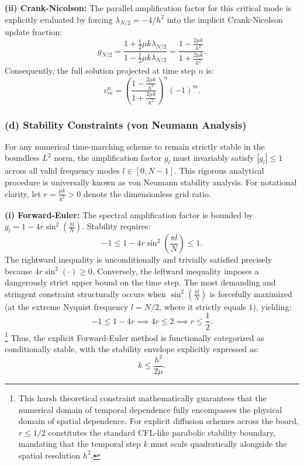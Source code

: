 \begin{solution}
\textbf{(ii) Crank-Nicolson:}
The parallel amplification factor for this critical mode is explicitly evaluated by forcing $\lambda_{N/2} = -4/h^2$ into the implicit Crank-Nicolson update fraction:
\[
g_{N/2} = \frac{1 + \frac{1}{2} \mu k \lambda_{N/2}}{1 - \frac{1}{2} \mu k \lambda_{N/2}} = \frac{1 - \frac{2 \mu k}{h^2}}{1 + \frac{2 \mu k}{h^2}}.
\]
Consequently, the full solution projected at time step $n$ is:
\[
v_m^n = \left( \frac{1 - \frac{2 \mu k}{h^2}}{1 + \frac{2 \mu k}{h^2}} \right)^n (-1)^m.
\]

\subsubsection*{(d) Stability Constraints (von Neumann Analysis)}
For any numerical time-marching scheme to remain strictly stable in the boundless $L^2$ norm, the amplification factor $g_l$ must invariably satisfy $|g_l| \leq 1$ across all valid frequency modes $l \in [0, N-1]$. This rigorous analytical procedure is universally known as von Neumann stability analysis. For notational clarity, let $r = \frac{\mu k}{h^2} > 0$ denote the dimensionless grid ratio.

\textbf{(i) Forward-Euler:}
The spectral amplification factor is bounded by $g_l = 1 - 4r \sin^2\left(\frac{\pi l}{N}\right)$. Stability requires:
\[
-1 \leq 1 - 4r \sin^2\left(\frac{\pi l}{N}\right) \leq 1.
\]
The rightward inequality is unconditionally and trivially satisfied precisely because $4r \sin^2(\cdot) \geq 0$. Conversely, the leftward inequality imposes a dangerously strict upper bound on the time step. The most demanding and stringent constraint structurally occurs when $\sin^2\left(\frac{\pi l}{N}\right)$ is forcefully maximized (at the extreme Nyquist frequency $l = N/2$, where it strictly equals $1$), yielding:
\[
-1 \leq 1 - 4r \implies 4r \leq 2 \implies r \leq \frac{1}{2}.
\]
\footnote{This harsh theoretical constraint mathematically guarantees that the numerical domain of temporal dependence fully encompasses the physical domain of spatial dependence. For explicit diffusion schemes across the board, $r \le 1/2$ constitutes the standard CFL-like parabolic stability boundary, mandating that the temporal step $k$ must scale quadratically alongside the spatial resolution $h^2$.}
Thus, the explicit Forward-Euler method is functionally categorized as conditionally stable, with the stability envelope explicitly expressed as:
\[
k \leq \frac{h^2}{2 \mu}.
\]


\end{solution}
